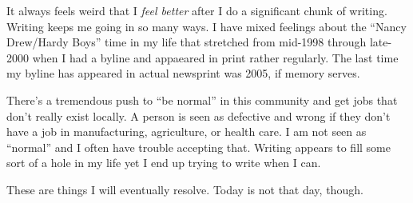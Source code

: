 It always feels weird that I \emph{feel better} after I do a significant
chunk of writing. Writing keeps me going in so many ways. I have mixed
feelings about the ``Nancy Drew/Hardy Boys'' time in my life that
stretched from mid-1998 through late-2000 when I had a byline and
appaeared in print rather regularly. The last time my byline has
appeared in actual newsprint was 2005, if memory serves.

There's a tremendous push to ``be normal'' in this community and get
jobs that don't really exist locally. A person is seen as defective and
wrong if they don't have a job in manufacturing, agriculture, or health
care. I am not seen as ``normal'' and I often have trouble accepting
that. Writing appears to fill some sort of a hole in my life yet I end
up trying to write when I can.

These are things I will eventually resolve. Today is not that day,
though.

